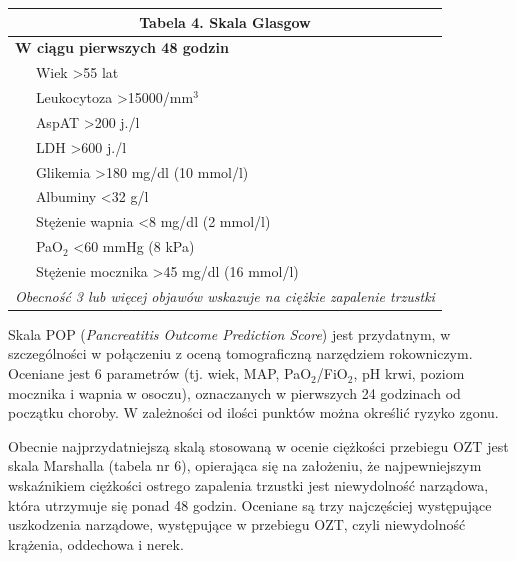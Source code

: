 \documentclass[a4paper, 12pt]{report}
\begin{document}
\begin{table}[!h]
\begin{center}
\begin{footnotesize}
\begin{tabular}{|l l|}
\hline
\multicolumn{2}{|c|}{\cellcolor[gray]{0.9} \textbf{Tabela 4. Skala Glasgow}}\\
\hline \hline
\multicolumn{2}{|l|}{\textbf{W ciągu pierwszych 48 godzin}}\\
\hline
 & Wiek >55 lat\\
 & Leukocytoza >15000/mm$^3$\\
 & AspAT >200 j./l\\
 & LDH >600 j./l\\
 & Glikemia >180 mg/dl (10 mmol/l)\\
 & Albuminy <32 g/l\\
 & Stężenie wapnia <8 mg/dl (2 mmol/l)\\
 & PaO$_2$ <60 mmHg (8 kPa)\\
 & Stężenie mocznika >45 mg/dl (16 mmol/l)\\
\hline \hline
\multicolumn{2}{|p{10cm}|}{\textsl{Obecność 3 lub więcej objawów wskazuje na ciężkie
  zapalenie trzustki}}\\
\hline
\end{tabular}
\end{footnotesize}
\end{center}
\end{table}

Skala POP (\textsl{Pancreatitis Outcome Prediction Score}) jest
przydatnym, w szczególności w połączeniu z oceną tomograficzną
narzędziem rokowniczym. Oceniane jest 6 parametrów (tj. wiek, MAP,
PaO$_2$/FiO$_2$, pH krwi, poziom mocznika i wapnia w osoczu),
oznaczanych w pierwszych 24 godzinach od początku choroby. W
zależności od ilości punktów można określić ryzyko zgonu.

Obecnie najprzydatniejszą skalą stosowaną w ocenie ciężkości przebiegu
OZT jest skala Marshalla (tabela nr 6), opierająca się na założeniu,
że najpewniejszym wskaźnikiem ciężkości ostrego zapalenia trzustki
jest niewydolność narządowa, która utrzymuje się ponad 48 godzin.
Oceniane są trzy najczęściej występujące uszkodzenia narządowe,
występujące w przebiegu OZT, czyli niewydolność krążenia, oddechowa i
nerek.
\end{document}
